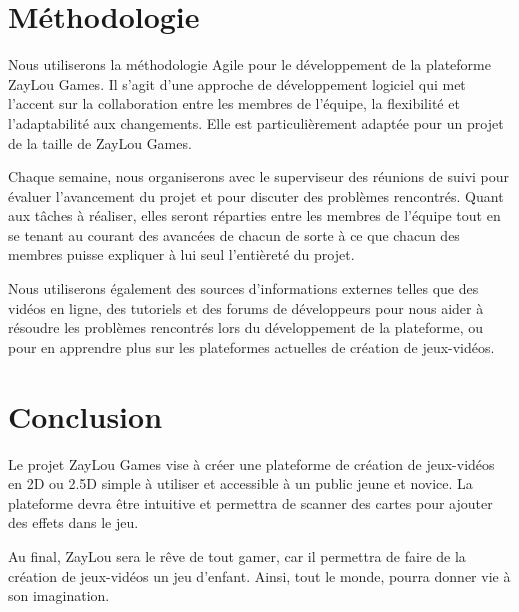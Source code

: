 \documentclass{article}                             %
\begin{document}
\section{Méthodologie}                              %
\label{sec:methodologie}                                    %
Nous utiliserons la méthodologie Agile pour le développement de la plateforme ZayLou
Games. Il s'agit d'une approche de développement logiciel qui met l'accent sur
la collaboration entre les membres de l'équipe, la flexibilité et l'adaptabilité aux
changements. Elle est particulièrement adaptée pour un projet de la taille de ZayLou Games.

Chaque semaine, nous organiserons avec le superviseur des réunions de suivi pour évaluer 
l'avancement du projet et pour discuter des problèmes rencontrés. Quant aux tâches à réaliser,
elles seront réparties entre les membres de l'équipe tout en se tenant au courant
des avancées de chacun de sorte à ce que chacun des membres puisse expliquer à lui seul l'entièreté
du projet.

Nous utiliserons également des sources d'informations externes telles que des vidéos en ligne,
des tutoriels et des forums de développeurs pour nous aider à résoudre les problèmes
rencontrés lors du développement de la plateforme, ou pour en apprendre plus sur les plateformes
actuelles de création de jeux-vidéos.

\section{Conclusion}                                %
\label{sec:conclusion}                             %
Le projet ZayLou Games vise à créer une plateforme de création de jeux-vidéos en 2D ou 2.5D 
simple à utiliser et accessible à un public jeune et novice. La plateforme devra être intuitive 
et permettra de scanner des cartes pour ajouter des effets dans le jeu.

Au final, ZayLou sera le rêve de tout gamer, car il permettra de faire de la
création de jeux-vidéos un jeu d'enfant. Ainsi, tout le monde, pourra donner vie à son 
imagination.
\end{document}
